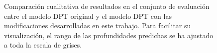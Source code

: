 \begin{figure}[!ht]
\hfil
\hfil
    
\caption{Comparación cualitativa de resultados en el conjunto de evaluación entre el modelo DPT original y el modelo DPT con las modificaciones desarrolladas en este trabajo. Para facilitar su visualización, el rango de las profundidades predichas se ha ajustado a toda la escala de grises.}
    \label{fig:comparacion-cualitativa}
    \end{figure}
\captionsetup[subfigure]{labelformat=parens}

\clearpage

